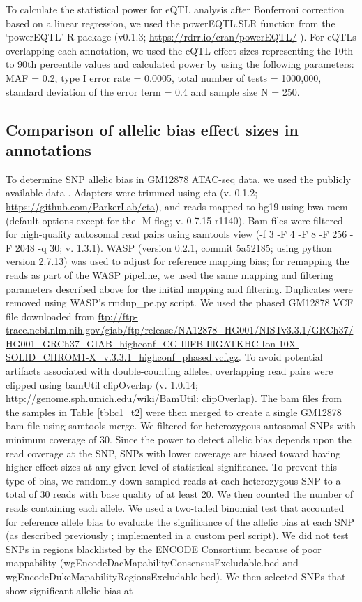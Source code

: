 To calculate the statistical power for eQTL analysis after Bonferroni correction based on a linear regression, we used the powerEQTL.SLR function from the ‘powerEQTL’ R package \cite{dongPowerEQTLPowerSample2017} (v0.1.3; \url{https://rdrr.io/cran/powerEQTL/} ). For eQTLs overlapping each annotation, we used the eQTL effect sizes representing the 10th to 90th percentile values and calculated power by using the following parameters: MAF = 0.2, type I error rate = 0.0005, total number of tests = 1000,000, standard deviation of the error term = 0.4 and sample size N = 250.

\subsection{Comparison of allelic bias effect sizes in annotations}
To determine SNP allelic bias in GM12878 ATAC-seq data, we used the publicly available data \cite{buenrostroTranspositionNativeChromatin2013}. Adapters were trimmed using cta (v. 0.1.2; \url{https://github.com/ParkerLab/cta}), and reads mapped to hg19 using bwa mem \cite{liAligningSequenceReads2013} (default options except for the -M flag; v. 0.7.15-r1140). Bam files were filtered for high-quality autosomal read pairs using samtools \cite{liSequenceAlignmentMap2009} view (-f 3 -F 4 -F 8 -F 256 -F 2048 -q 30; v. 1.3.1). WASP \cite{geijnWASPAllelespecificSoftware2015} (version 0.2.1, commit 5a52185; using python version 2.7.13) was used to adjust for reference mapping bias; for remapping the reads as part of the WASP pipeline, we used the same mapping and filtering parameters described above for the initial mapping and filtering. Duplicates were removed using WASP’s rmdup\_pe.py script. We used the phased GM12878 VCF file downloaded from \url{ftp://ftp-trace.ncbi.nlm.nih.gov/giab/ftp/release/NA12878\_HG001/NISTv3.3.1/GRCh37/HG001\_GRCh37\_GIAB\_highconf\_CG-IllFB-IllGATKHC-Ion-10X-SOLID\_CHROM1-X\_v.3.3.1\_highconf_phased.vcf.gz}. To avoid potential artifacts associated with double-counting alleles, overlapping read pairs were clipped using bamUtil clipOverlap (v. 1.0.14; \url{http://genome.sph.umich.edu/wiki/BamUtil}: clipOverlap). The bam files from the samples in Table \ref{tbl:c1_t2} were then merged to create a single GM12878 bam file using samtools merge. We filtered for heterozygous autosomal SNPs with minimum coverage of 30. Since the power to detect allelic bias depends upon the read coverage at the SNP, SNPs with lower coverage are biased toward having higher effect sizes at any given level of statistical significance. To prevent this type of bias, we randomly down-sampled reads at each heterozygous SNP to a total of 30 reads with base quality of at least 20. We then counted the number of reads containing each allele. We used a two-tailed binomial test that accounted for reference allele bias to evaluate the significance of the allelic bias at each SNP (as described previously \cite{varshneyGeneticRegulatorySignatures2017}; implemented in a custom perl script). We did not test SNPs in regions blacklisted by the ENCODE Consortium because of poor mappability (wgEncodeDacMapabilityConsensusExcludable.bed and wgEncodeDukeMapabilityRegionsExcludable.bed). We then selected SNPs that show significant allelic bias at 